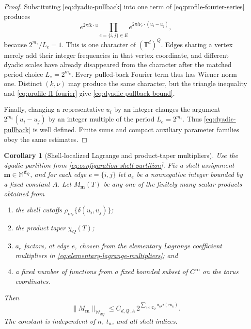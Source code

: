 \documentclass[11pt]{article}
\newtheorem{corollary}[corollary]{Corollary}
\newcommand{\Torus}{\mathbb{T}}
\newcommand{\cW}{\mathcal{W}}
\newcommand{\norm}[1]{\lVert #1\rVert}
\begin{document}
\begin{proof}
Substituting \eqref{eq:dyadic-pullback} into one term of
\eqref{eq:profile-fourier-series} produces
\[
 e^{2\pi i k\cdot u}
 \prod_{e=\{i,j\}\in E}
 e^{2\pi i\nu_e\cdot(u_i-u_j)},
\]
because \(2^{m_e}/L_e=1\).  This is one character of
\((\Torus^d)^Q\).  Edges sharing a vertex merely add their integer
frequencies in that vertex coordinate, and different dyadic scales have
already disappeared from the character after the matched period choice
\(L_e=2^{m_e}\).  Every pulled-back Fourier term thus has Wiener norm one.
Distinct \((k,\nu)\) may produce the same character, but the triangle
inequality and \eqref{eq:profile-l1-fourier} give
\eqref{eq:dyadic-pullback-bound}.

Finally, changing a representative \(u_i\) by an integer changes the
argument \(2^{m_e}(u_i-u_j)\) by an integer multiple of the period
\(L_e=2^{m_e}\).  Thus \eqref{eq:dyadic-pullback} is well defined.  Finite
sums and compact auxiliary parameter families obey the same estimates.
\end{proof}

\begin{corollary}[Shell-localized Lagrange and product-taper multipliers]
\label{cor:configuration-multipliers}
Use the dyadic partition from
\eqref{eq:configuration-shell-partition}.  Fix a shell assignment
\(\bm m\in\mathbb M^{\mathfrak E_Q}\), and for each edge
\(e=\{i,j\}\) let \(a_e\) be a nonnegative integer bounded by a fixed
constant \(A\).  Let \(M_{\bm m}(T)\) be any one of the finitely many scalar
products obtained from
\begin{enumerate}
\item the shell cutoffs \(\rho_{m_e}\{\delta(u_i,u_j)\}\);
\item the product taper \(\chi_Q(T)\);
\item \(a_e\) factors, at edge \(e\), chosen from the elementary
      Lagrange coefficient multipliers in
      \eqref{eq:elementary-lagrange-multipliers}; and
\item a fixed number of functions from a fixed bounded subset of
      \(C^\infty\) on the torus coordinates.
\end{enumerate}
Then
\begin{equation}
 \norm{M_{\bm m}}_{\cW_{dQ}}
 \le C_{d,Q,A}\,
      2^{\sum_{e\in\mathfrak E_Q}a_e\mu(m_e)}.
 \label{eq:configuration-multiplier-bound}
\end{equation}
The constant is independent of \(n\), \(t_n\), and all shell indices.
\end{corollary}
\end{document}
